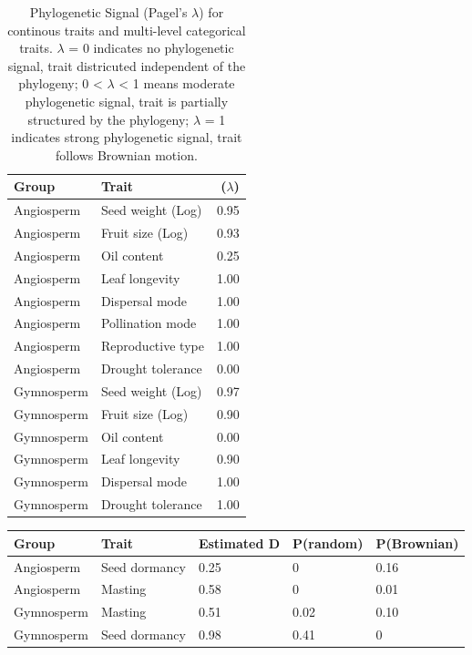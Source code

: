 \documentclass{article}
\begin{document}
\begin{enumerate}
\begin{table}[ht]
\label{tab:regressiongym}
\end{table}

\begin{table}[ht]
\centering
\begin{tabular}{llr}
  \hline
Group & Trait & ($\lambda$) \\ 
  \hline
  Angiosperm & Seed weight (Log) & 0.95 \\ 
  Angiosperm & Fruit size (Log) & 0.93 \\ 
  Angiosperm & Oil content & 0.25 \\ 
  Angiosperm & Leaf longevity & 1.00 \\ 
  Angiosperm & Dispersal mode & 1.00 \\ 
  Angiosperm & Pollination mode & 1.00 \\ 
  Angiosperm & Reproductive type & 1.00 \\ 
  Angiosperm & Drought tolerance & 0.00 \\ 
  Gymnosperm & Seed weight (Log) & 0.97 \\ 
  Gymnosperm & Fruit size (Log) & 0.90 \\ 
  Gymnosperm & Oil content & 0.00 \\ 
  Gymnosperm & Leaf longevity & 0.90 \\ 
  Gymnosperm & Dispersal mode & 1.00 \\ 
  Gymnosperm & Drought tolerance & 1.00 \\ 
   \hline
\end{tabular}
\caption{Phylogenetic Signal (Pagel's $\lambda$) for continous traits and multi-level categorical traits. $\lambda$ = 0 indicates no phylogenetic signal, trait districuted independent of the phylogeny; 0 < $\lambda$ < 1 means moderate phylogenetic signal, trait is partially structured by the phylogeny; $\lambda$ = 1 indicates strong phylogenetic signal, trait follows Brownian motion. } 
\label{tab:lambda}
\end{table}
\begin{table}[ht]
\centering
\begin{tabular}{lllll}
  \hline
Group & Trait & Estimated D & P(random) & P(Brownian) \\ 
  \hline
  Angiosperm & Seed dormancy & 0.25 & 0 & 0.16 \\ 
  Angiosperm & Masting & 0.58 & 0 & 0.01 \\ 
  Gymnosperm & Masting & 0.51 & 0.02 & 0.10 \\ 
  Gymnosperm & Seed dormancy & 0.98 & 0.41 & 0 \\ 

\end{tabular}
\end{table}
\end{enumerate}
\end{document}
